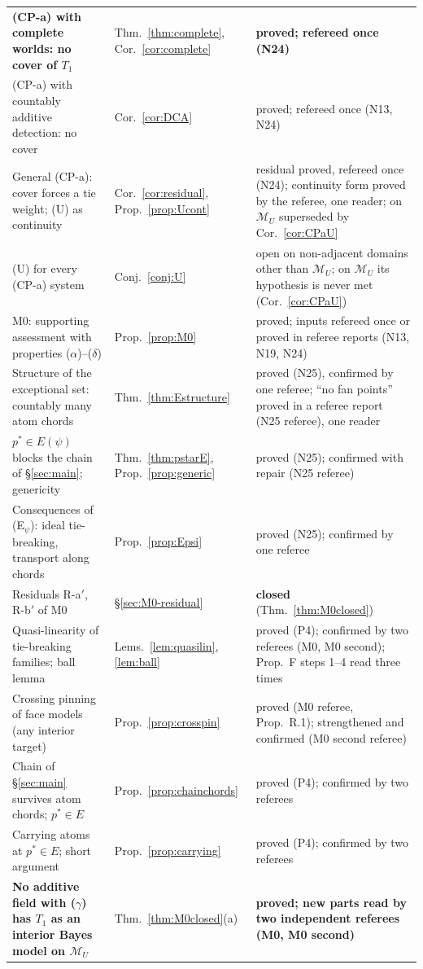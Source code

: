 \documentclass[11pt]{article}
\theoremstyle{definition}
\theoremstyle{remark}
\newcommand{\M}{\mathcal M}
\begin{document}
{\begin{longtable}{>{\raggedright\arraybackslash}p{6.4cm}>{\raggedright\arraybackslash}p{2.1cm}>{\raggedright\arraybackslash}p{5.6cm}}
\textbf{(CP-a) with complete worlds: no cover of $T_1$} & Thm.~\ref{thm:complete}, Cor.~\ref{cor:complete} & \textbf{proved; refereed once (N24)}\\
(CP-a) with countably additive detection: no cover & Cor.~\ref{cor:DCA} & proved; refereed once (N13, N24)\\
General (CP-a): cover forces a tie weight; (U) as continuity & Cor.~\ref{cor:residual}, Prop.~\ref{prop:Ucont} & residual proved, refereed once (N24); continuity form proved by the referee, one reader; on $\M_U$ superseded by Cor.~\ref{cor:CPaU}\\
(U) for every (CP-a) system & Conj.~\ref{conj:U} & open on non-adjacent domains other than $\M_U$; on $\M_U$ its hypothesis is never met (Cor.~\ref{cor:CPaU})\\
M0: supporting assessment with properties ($\alpha$)--($\delta$) & Prop.~\ref{prop:M0} & proved; inputs refereed once or proved in referee reports (N13, N19, N24)\\
Structure of the exceptional set: countably many atom chords & Thm.~\ref{thm:Estructure} & proved (N25), confirmed by one referee; ``no fan points'' proved in a referee report (N25 referee), one reader\\
$p^*\in E(\psi)$ blocks the chain of \S\ref{sec:main}; genericity & Thm.~\ref{thm:pstarE}, Prop.~\ref{prop:generic} & proved (N25); confirmed with repair (N25 referee)\\
Consequences of (E$_\psi$): ideal tie-breaking, transport along chords & Prop.~\ref{prop:Epsi} & proved (N25); confirmed by one referee\\
Residuals R-a$'$, R-b$'$ of M0 & \S\ref{sec:M0-residual} & \textbf{closed} (Thm.~\ref{thm:M0closed})\\
Quasi-linearity of tie-breaking families; ball lemma & Lems.~\ref{lem:quasilin}, \ref{lem:ball} & proved (P4); confirmed by two referees (M0, M0 second); Prop.~F steps 1--4 read three times\\
Crossing pinning of face models (any interior target) & Prop.~\ref{prop:crosspin} & proved (M0 referee, Prop.~R.1); strengthened and confirmed (M0 second referee)\\
Chain of \S\ref{sec:main} survives atom chords; $p^*\in E$ & Prop.~\ref{prop:chainchords} & proved (P4); confirmed by two referees\\
Carrying atoms at $p^*\in E$; short argument & Prop.~\ref{prop:carrying} & proved (P4); confirmed by two referees\\
\textbf{No additive field with ($\gamma$) has $T_1$ as an interior Bayes model on $\M_U$} & Thm.~\ref{thm:M0closed}(a) & \textbf{proved; new parts read by two independent referees (M0, M0 second)}\\

\end{longtable}}
\end{document}

